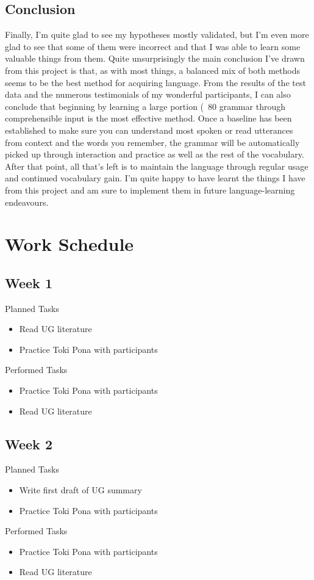 \documentclass[a4paper,10pt]{article}
\begin{document}
\subsection{Conclusion}
Finally, I'm quite glad to see my hypotheses mostly validated, but I'm even more glad to see that some
of them were incorrect and that I was able to learn some valuable things from them. Quite unsurprisingly
the main conclusion I've drawn from this project is that, as with most things, a balanced mix of both
methods seems to be the best method for acquiring language. From the results of the test data and the
numerous testimonials of my wonderful participants, I can also conclude that beginning by learning
a large portion (~80%
grammar through comprehensible input is the most effective method. Once a baseline has been established
to make sure you can understand most spoken or read utterances from context and the words you remember,
the grammar will be automatically picked up through interaction and practice as well as the rest of the
vocabulary. After that point, all that's left is to maintain the language through regular usage and
continued vocabulary gain. I'm quite happy to have learnt the things I have from this project and am
sure to implement them in future language-learning endeavours.


\section{Work Schedule}
\subsection{Week 1}
\large{Planned Tasks}
\begin{itemize}
	\item Read UG literature
	\item Practice Toki Pona with participants
\end{itemize}
\large{Performed Tasks}
\begin{itemize}
	\item Practice Toki Pona with participants
	\item Read UG literature
\end{itemize}
\subsection{Week 2}
\large{Planned Tasks}
\begin{itemize}
	\item Write first draft of UG summary
	\item Practice Toki Pona with participants
\end{itemize}
\large{Performed Tasks}
\begin{itemize}
	\item Practice Toki Pona with participants
	\item Read UG literature
\end{itemize}
\end{document}
